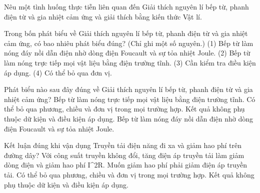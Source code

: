 \begin{bt}
Nêu một tình huống thực tiễn liên quan đến Giải thích nguyên lí bếp từ, phanh điện từ và gia nhiệt cảm ứng và giải thích bằng kiến thức Vật lí.
\end{bt}

\begin{ex}
Trong bốn phát biểu về Giải thích nguyên lí bếp từ, phanh điện từ và gia nhiệt cảm ứng, có bao nhiêu phát biểu đúng? (Chỉ ghi một số nguyên.) (1) Bếp từ làm nóng đáy nồi dẫn điện nhờ dòng điện Foucault và sự tỏa nhiệt Joule. (2) Bếp từ làm nóng trực tiếp mọi vật liệu bằng điện trường tĩnh. (3) Cần kiểm tra điều kiện áp dụng. (4) Có thể bỏ qua đơn vị.
\end{ex}

\begin{ex}
Phát biểu nào sau đây đúng về Giải thích nguyên lí bếp từ, phanh điện từ và gia nhiệt cảm ứng?
\choice
{Bếp từ làm nóng trực tiếp mọi vật liệu bằng điện trường tĩnh.}
{Có thể bỏ qua phương, chiều và đơn vị trong mọi trường hợp.}
{Kết quả không phụ thuộc dữ kiện và điều kiện áp dụng.}
{\True Bếp từ làm nóng đáy nồi dẫn điện nhờ dòng điện Foucault và sự tỏa nhiệt Joule.}
\end{ex}

\begin{ex}
Kết luận đúng khi vận dụng Truyền tải điện năng đi xa và giảm hao phí trên đường dây?
\choice
{\True Với công suất truyền không đổi, tăng điện áp truyền tải làm giảm dòng điện và giảm hao phí I^2R.}
{Muốn giảm hao phí phải giảm điện áp truyền tải.}
{Có thể bỏ qua phương, chiều và đơn vị trong mọi trường hợp.}
{Kết quả không phụ thuộc dữ kiện và điều kiện áp dụng.}
\end{ex}

